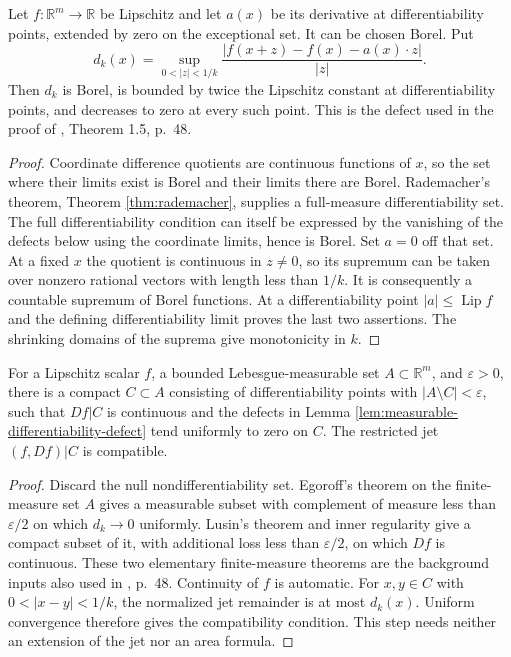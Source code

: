 \begin{lemma}\label{lem:measurable-differentiability-defect}
Let $f:\mathbb R^m\to\mathbb R$ be Lipschitz and let $a(x)$ be its derivative at differentiability points, extended by zero on the exceptional set. It can be chosen Borel. Put
\[
 d_k(x)=\sup_{0<|z|<1/k}
 \frac{|f(x+z)-f(x)-a(x)\cdot z|}{|z|}.
\]
Then $d_k$ is Borel, is bounded by twice the Lipschitz constant at differentiability points, and decreases to zero at every such point. This is the defect used in the proof of \cite{Sim18}, Theorem 1.5, p.~48.
\end{lemma}
\begin{proof}
Coordinate difference quotients are continuous functions of $x$, so the set where their limits exist is Borel and their limits there are Borel. Rademacher's theorem, Theorem \ref{thm:rademacher}, supplies a full-measure differentiability set. The full differentiability condition can itself be expressed by the vanishing of the defects below using the coordinate limits, hence is Borel. Set $a=0$ off that set. At a fixed $x$ the quotient is continuous in $z\ne0$, so its supremum can be taken over nonzero rational vectors with length less than $1/k$. It is consequently a countable supremum of Borel functions. At a differentiability point $|a|\leq\operatorname{Lip}f$ and the defining differentiability limit proves the last two assertions. The shrinking domains of the suprema give monotonicity in $k$.
\end{proof}

\begin{lemma}\label{lem:compact-good-lipschitz-jets}
For a Lipschitz scalar $f$, a bounded Lebesgue-measurable set $A\subset\mathbb R^m$, and $\varepsilon>0$, there is a compact $C\subset A$ consisting of differentiability points with $|A\setminus C|<\varepsilon$, such that $Df|C$ is continuous and the defects in Lemma \ref{lem:measurable-differentiability-defect} tend uniformly to zero on $C$. The restricted jet $(f,Df)|C$ is compatible.
\end{lemma}
\begin{proof}
Discard the null nondifferentiability set. Egoroff's theorem on the finite-measure set $A$ gives a measurable subset with complement of measure less than $\varepsilon/2$ on which $d_k\to0$ uniformly. Lusin's theorem and inner regularity give a compact subset of it, with additional loss less than $\varepsilon/2$, on which $Df$ is continuous. These two elementary finite-measure theorems are the background inputs also used in \cite{Sim18}, p.~48. Continuity of $f$ is automatic. For $x,y\in C$ with $0<|x-y|<1/k$, the normalized jet remainder is at most $d_k(x)$. Uniform convergence therefore gives the compatibility condition. This step needs neither an extension of the jet nor an area formula.
\end{proof}

